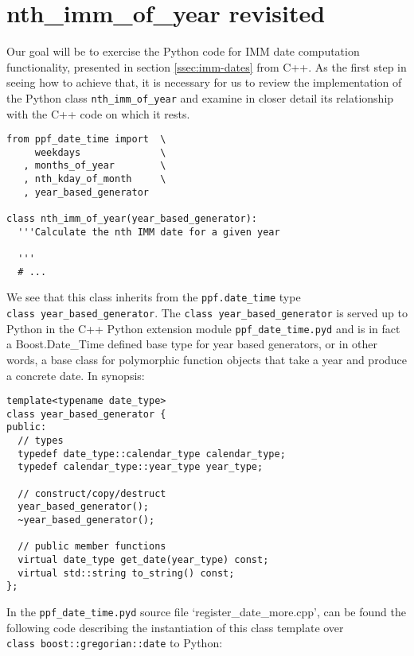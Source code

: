 \section{nth\_imm\_of\_year revisited}
Our goal will be to exercise the Python code for IMM date computation
functionality, presented in section \ref{ssec:imm-dates} from C++. As
the first step in seeing how to achieve that, it is necessary for us to
review the implementation of the Python class \verb|nth_imm_of_year|
and examine in closer detail its relationship with the C++ code on
which it rests.
\begin{verbatim}
from ppf_date_time import  \
     weekdays              \
   , months_of_year        \
   , nth_kday_of_month     \
   , year_based_generator

class nth_imm_of_year(year_based_generator):
  '''Calculate the nth IMM date for a given year

  '''
  # ...
\end{verbatim}
We see that this class inherits from the \verb|ppf.date_time| type \\
\verb|class year_based_generator|. The \verb|class year_based_generator|
 is served up to Python in the C++ Python extension module
\verb|ppf_date_time.pyd| and is in fact a
Boost.Date\_Time defined base type for year based generators, or in other 
words, a base class for polymorphic function objects that take a year 
and produce a concrete date. In synopsis:
\begin{verbatim}
template<typename date_type> 
class year_based_generator {
public:
  // types
  typedef date_type::calendar_type calendar_type;
  typedef calendar_type::year_type year_type;    

  // construct/copy/destruct
  year_based_generator();
  ~year_based_generator();

  // public member functions
  virtual date_type get_date(year_type) const;
  virtual std::string to_string() const;
};
\end{verbatim}
In the \verb|ppf_date_time.pyd| source file
`register\_date\_more.cpp', can be found the following code
describing the instantiation of this class template over \\
\verb|class boost::gregorian::date| to Python:
